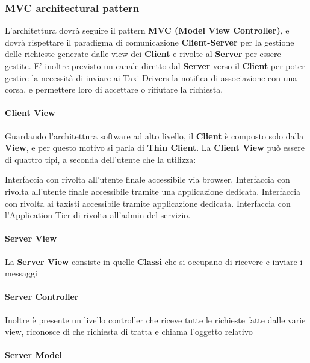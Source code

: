 \subsubsection{MVC architectural pattern}
L'architettura dovrà seguire il pattern \textbf{MVC (Model View Controller)}, e dovrà rispettare il paradigma di comunicazione \textbf{Client-Server} per la gestione delle richieste generate dalle view dei \textbf{Client} e rivolte al \textbf{Server} per essere gestite. 
E' inoltre previsto un canale diretto dal \textbf{Server} verso il \textbf{Client} per poter gestire la necessità di inviare ai Taxi Drivers la notifica di associazione con una corsa, e permettere loro di accettare o rifiutare la richiesta.
\paragraph{Client View}
Guardando l'architettura software ad alto livello, il \textbf{Client} è composto solo dalla \textbf{View}, e per questo motivo si parla di \textbf{Thin Client}. 
La \textbf{Client View} può essere di quattro tipi, a seconda dell'utente che la utilizza: 
\begin{itemize}
	 Interfaccia con \myTaxiService{} rivolta all'utente finale accessibile via browser.
	 Interfaccia con \myTaxiService{} rivolta all'utente finale accessibile tramite una applicazione dedicata.
	 Interfaccia con \myTaxiService{} rivolta ai taxisti accessibile tramite applicazione dedicata.
	 Interfaccia con l'Application Tier di \myTaxiService{} rivolta all'admin del servizio.
\end{itemize}
\paragraph{Server View}
La \textbf{Server View} consiste in quelle \textbf{Classi} che si occupano di ricevere e inviare i messaggi
\paragraph{Server Controller}
Inoltre è presente un livello controller che riceve tutte le richieste fatte dalle varie view, riconosce di che richiesta di tratta e chiama l'oggetto relativo 
\paragraph{Server Model}

